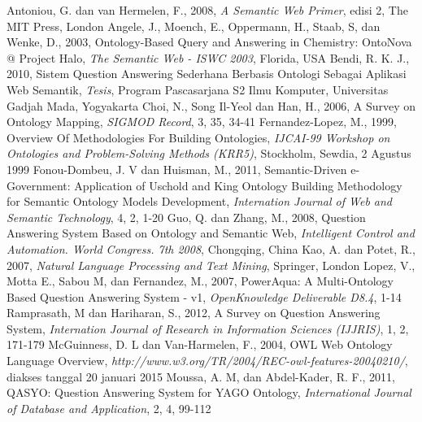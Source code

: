 \begin{thebibliography}{99}
		Antoniou, G. dan van Hermelen, F., 2008, \emph{A Semantic Web Primer}, edisi 2, The MIT Press, London
		Angele, J., Moench, E., Oppermann, H., Staab, S, dan Wenke, D., 2003, Ontology-Based Query and Answering in Chemistry: OntoNova @ Project Halo, \emph{The Semantic Web - ISWC 2003}, Florida, USA
		Bendi, R. K. J., 2010, Sistem Question Answering Sederhana Berbasis Ontologi Sebagai Aplikasi Web Semantik, \emph{Tesis}, Program Pascasarjana S2 Ilmu Komputer, Universitas Gadjah Mada, Yogyakarta
		Choi, N., Song Il-Yeol dan Han, H., 2006, A Survey on Ontology Mapping, \emph{SIGMOD Record}, 3, 35, 34-41
		Fernandez-Lopez, M., 1999, Overview Of Methodologies For Building Ontologies, \emph{IJCAI-99 Workshop on Ontologies and Problem-Solving Methods (KRR5)}, Stockholm, Sewdia, 2 Agustus 1999
		Fonou-Dombeu, J. V dan Huisman, M., 2011, Semantic-Driven e-Government: Application of Uschold and King Ontology Building Methodology for Semantic Ontology Models Development, \emph{Internation Journal of Web and Semantic Technology}, 4, 2, 1-20
		Guo, Q. dan Zhang, M., 2008, Question Answering System Based on Ontology and Semantic Web, \emph{Intelligent Control and Automation. World Congress. 7th 2008}, Chongqing, China
		Kao, A. dan Potet, R., 2007, \emph{Natural Language Processing and Text Mining}, Springer, London
		Lopez, V., Motta E., Sabou M, dan Fernandez, M., 2007, PowerAqua: A Multi-Ontology Based Question Answering System - v1, \emph{OpenKnowledge Deliverable D8.4}, 1-14
		Ramprasath, M dan Hariharan, S., 2012, A Survey on Question Answering System, \emph{Internation Journal of Research in Information Sciences (IJJRIS)}, 1, 2, 171-179
		McGuinness, D. L dan Van-Harmelen, F., 2004, OWL Web Ontology Language Overview, \emph{http://www.w3.org/TR/2004/REC-owl-features-20040210/}, diakses tanggal 20 januari 2015
		Moussa, A. M, dan Abdel-Kader, R. F., 2011, QASYO: Question Answering System for YAGO Ontology, \emph{International Journal of Database and Application}, 2, 4, 99-112

\end{thebibliography}

